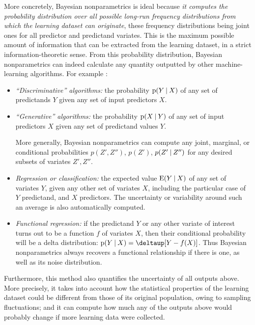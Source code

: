 \documentclass[a4paper,12pt,%
onecolumn,oneside,article,%
british%
]{memoir}
\theoremstyle{remark}
\theoremstyle{innote}
\newcommand*{\delt}{\deltaup}%
\newcommand*{\p}{\mathrm{p}}%
\newcommand*{\E}{\mathrm{E}}
\renewcommand*{\|}[1][]{\nonscript\:#1\vert\nonscript\:\mathopen{}}
\newcommand*{\sect}{\S}%
\newcommand*{\eg}{{e.g.}}
\begin{document}
More concretely, Bayesian nonparametrics is ideal because \emph{it computes the probability distribution over all possible long-run frequency distributions from which the learning dataset can originate}, these frequency distributions being joint ones for all predictor and predictand variates. This is the maximum possible amount of information that can be extracted from the learning dataset, in a strict information-theoretic sense. From this probability distribution, Bayesian nonparametrics can indeed calculate any quantity outputted by other machine-learning algorithms. For example \autocites[for terminology see \eg][\sect\,8.6]{murphy2012}:
\begin{itemize}
\item \emph{\enquote{Discriminative} algorithms:} the probability $\p(Y \| X)$ of any set of predictands $Y$ given any set of input predictors $X$.

\item \emph{\enquote{Generative} algorithms:}  the probability $\p(X \| Y)$ of any set of input predictors $X$ given any set of predictand values $Y$.

  More generally, Bayesian nonparametrics can compute any joint, marginal, or conditional probabilities $p(Z',Z'')$, $p(Z')$, $p(Z'\|Z'')$ for any desired subsets of variates $Z', Z''$.

\item \emph{Regression or classification:} the expected value $\E(Y\|X)$ of any set of variates $Y$, given any other set of variates $X$, including the particular case of $Y$ predictand, and $X$ predictors. The uncertainty or variability around such an average is also automatically computed.
  
\item \emph{Functional regression:} if the predictand $Y$ or any other variate of interest turns out to be a function $f$ of variates $X$, then their conditional probability will be a delta distribution: $\p(Y\|X) = \delt[Y-f(X)]$.
  Thus Bayesian nonparametrics always recovers a functional relationship if there is one, as well as its noise distribution.
\end{itemize}
Furthermore, this method also quantifies the uncertainty of all outputs above. More precisely, it takes into account how the statistical properties of the learning dataset could be different from those of its original population, owing to sampling fluctuations; and it can compute how much any of the outputs above would probably change if more learning data were collected.
\end{document}
